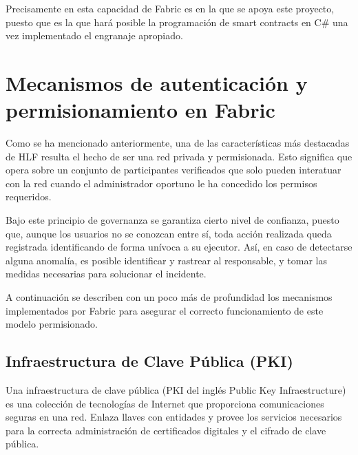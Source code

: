 Precisamente en esta capacidad de Fabric es en la que se apoya este proyecto, puesto que es la que har\'a posible la programaci\'on de smart contracts en C\# una vez implementado el engranaje apropiado.
 
\section{Mecanismos de autenticaci\'on y\\ permisionamiento en Fabric}
Como se ha mencionado anteriormente, una de las caracter\'isticas m\'as destacadas de HLF resulta el hecho de ser una red privada y permisionada. Esto significa que opera sobre un conjunto de participantes verificados que solo pueden interatuar con la red cuando el administrador oportuno le ha concedido los permisos requeridos. 

Bajo este principio de governanza se garantiza cierto nivel de confianza, puesto que, aunque los usuarios no se conozcan entre s\'i, toda acci\'on realizada queda registrada identificando de forma un\'ivoca a su ejecutor. As\'i, en caso de detectarse alguna anomal\'ia, es posible identificar y rastrear al responsable, y tomar las medidas necesarias para solucionar el incidente.

A continuaci\'on se describen con un poco m\'as de profundidad los mecanismos implementados por Fabric para asegurar el correcto funcionamiento de este modelo permisionado.

\subsection{Infraestructura de Clave P\'ublica (PKI)}
Una infraestructura de clave p\'ublica (PKI del ingl\'es Public Key Infraestructure) es una colección de tecnolog\'ias de Internet que proporciona comunicaciones seguras en una red. Enlaza llaves con entidades y provee los servicios necesarios para la correcta administraci\'on de certificados digitales y el cifrado de clave p\'ublica.

